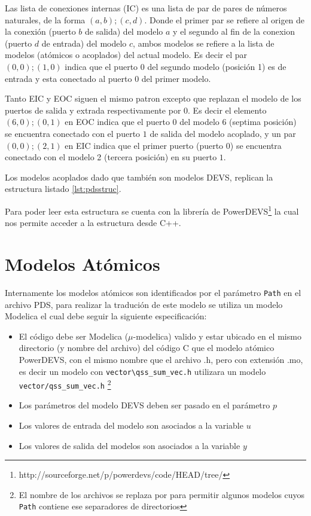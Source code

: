 	Las lista de conexiones internas (IC) es una lista de par de pares de números naturales, de la forma $(a,b);(c,d)$.
	Donde el primer par se refiere al origen de la conexión (puerto $b$ de salida) del modelo $a$ y el segundo al fin de la conexion (puerto $d$ de entrada) 
	del modelo $c$, ambos modelos se refiere a la lista de modelos (atómicos o acoplados) del actual modelo.
	Es decir el par $(0,0);(1,0)$ indica que el puerto $0$ del segundo modelo (posición 1) es de entrada  y esta conectado al puerto $0$ del primer modelo.

	Tanto EIC y EOC siguen el mismo patron excepto que replazan el modelo de los puertos de salida y extrada respectivamente por $0$. Es decir el elemento 
	$(6,0);(0,1)$ en EOC indica que el puerto $0$ del modelo $6$ (septima posición)  se encuentra conectado con el puerto $1$ de salida del modelo 
	acoplado, y un par $(0,0);(2,1)$ en EIC indica que el primer puerto (puerto $0$) se encuentra conectado con el modelo 2 (tercera posición) en su puerto $1$.

        Los modelos acoplados dado que también son modelos DEVS, replican la estructura listado \ref{lst:pdsstruc}.

        Para poder leer esta estructura se cuenta con la librería de PowerDEVS\footnote{http://sourceforge.net/p/powerdevs/code/HEAD/tree/} la cual nos permite acceder
        a la estructura desde C++. 

\section{Modelos Atómicos}
	
	Internamente los modelos atómicos son identificados por el parámetro \texttt{Path} en el archivo PDS, para realizar la tradución de este modelo se utiliza 
	un modelo Modelica el cual debe seguir la siguiente especificación:

\begin{itemize}
	\item El código debe ser Modelica ($\mu$-modelica) valido y estar ubicado en el mismo directorio (y nombre del archivo) del código C que el modelo atómico 
	PowerDEVS, con el mismo nombre que el archivo .h, pero con extensión .mo, es decir un modelo con \texttt{vector\textbackslash qss\_sum\_vec.h} utilizara un modelo 
	\texttt{vector/qss\_sum\_vec.h} \footnote{El nombre de los archivos se replaza \quotes{\textbackslash} por \quotes{/} para permitir algunos modelos 
	cuyos \texttt{Path} contiene ese separadores de directorios}
	\item Los parámetros del modelo DEVS deben ser pasado en el parámetro $p$
	\item Los valores de entrada del modelo son asociados a la variable $u$
	\item Los valores de salida del modelos son asociados a la variable $y$
\end{itemize}

